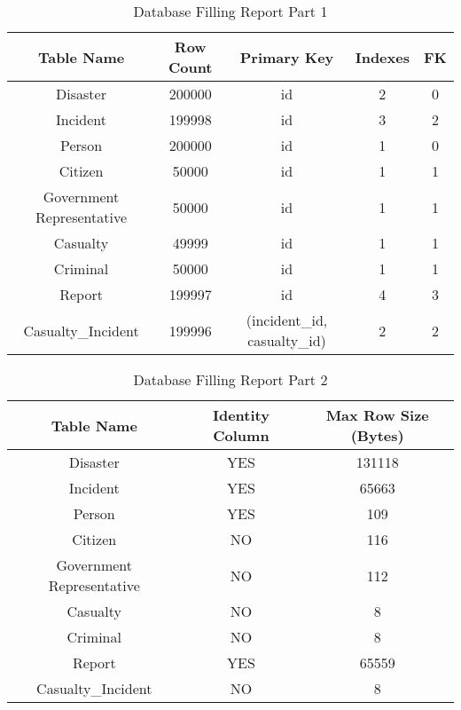 \begin{table}[h!]
\centering
\begin{tabular}{||c | c | c | c | c||} 
 \hline
 Table Name & Row Count & Primary Key & Indexes & FK  \\ [0.5ex] 
 \hline\hline
 Disaster & 200000 & id & 2 & 0 \\ 
 \hline
 Incident & 199998 & id & 3 & 2 \\
 \hline
 Person & 200000 & id & 1 & 0 \\
 \hline
 Citizen & 50000 & id & 1 & 1 \\
 \hline
 Government Representative & 50000 & id & 1 & 1 \\
 \hline
 Casualty & 49999 & id & 1 & 1 \\
 \hline
 Criminal & 50000 & id & 1 & 1 \\
 \hline
 Report & 199997 & id & 4 & 3 \\
 \hline
 Casualty\_Incident & 199996 & (incident\_id, casualty\_id) & 2 & 2 \\ [1ex] 
 \hline
\end{tabular}
\caption{Database Filling Report Part 1}
\label{table:1}
\end{table}

\begin{table}[h!]
\centering
\begin{tabular}{||c | c | c||} 
 \hline
 Table Name & Identity Column & Max Row Size (Bytes) \\ [0.5ex] 
 \hline\hline
 Disaster & YES & 131118 \\ 
 \hline
 Incident & YES & 65663 \\
 \hline
 Person & YES & 109 \\
 \hline
 Citizen & NO & 116 \\
 \hline
 Government Representative & NO & 112 \\
 \hline
 Casualty & NO & 8 \\
 \hline
 Criminal & NO & 8 \\
 \hline
 Report & YES & 65559 \\
 \hline
 Casualty\_Incident & NO & 8 \\ [1ex] 
 \hline
\end{tabular}
\caption{Database Filling Report Part 2}
\label{table:2}
\end{table}
